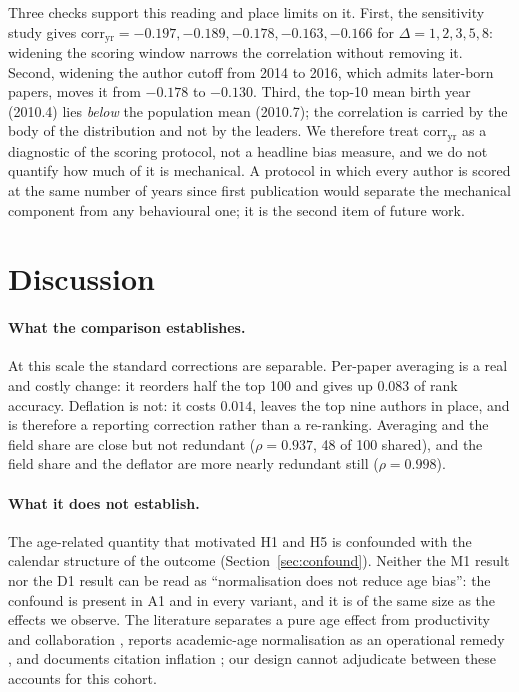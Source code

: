 \documentclass{article}
\begin{document}
Three checks support this reading and place limits on it. First, the sensitivity study gives
$\text{corr}_{\text{yr}} = -0.197, -0.189, -0.178, -0.163, -0.166$ for $\Delta = 1, 2, 3, 5, 8$:
widening the scoring window narrows the correlation without removing it. Second, widening the
author cutoff from 2014 to 2016, which admits later-born papers, moves it from $-0.178$ to
$-0.130$. Third, the top-10 mean birth year (2010.4) lies \emph{below} the population mean
(2010.7); the correlation is carried by the body of the distribution and not by the leaders. We
therefore treat $\text{corr}_{\text{yr}}$ as a diagnostic of the scoring protocol, not a
headline bias measure, and we do not quantify how much of it is mechanical. A protocol in which
every author is scored at the same number of years since first publication would separate the
mechanical component from any behavioural one; it is the second item of future work.

\section{Discussion}

\paragraph{What the comparison establishes.} At this scale the standard corrections are
separable. Per-paper averaging is a real and costly change: it reorders half the top 100 and gives
up $0.083$ of rank accuracy. Deflation is not: it costs $0.014$, leaves the top nine authors in
place, and is therefore a reporting correction rather than a re-ranking. Averaging and the field
share are close but not redundant ($\rho = 0.937$, 48 of 100 shared), and the field share and the
deflator are more nearly redundant still ($\rho = 0.998$).

\paragraph{What it does not establish.} The age-related quantity that motivated H1 and H5 is
confounded with the calendar structure of the outcome (Section~\ref{sec:confound}). Neither the
M1 result nor the D1 result can be read as ``normalisation does not reduce age bias'': the
confound is present in A1 and in every variant, and it is of the same size as the effects we
observe. The literature separates a pure age effect from productivity and collaboration
\citep{huang2012academicage}, reports academic-age normalisation as an operational remedy
\citep{gyorffy2026platform}, and documents citation inflation \citep{petersen2019inflation}; our design cannot
adjudicate between these accounts for this cohort.
\end{document}
